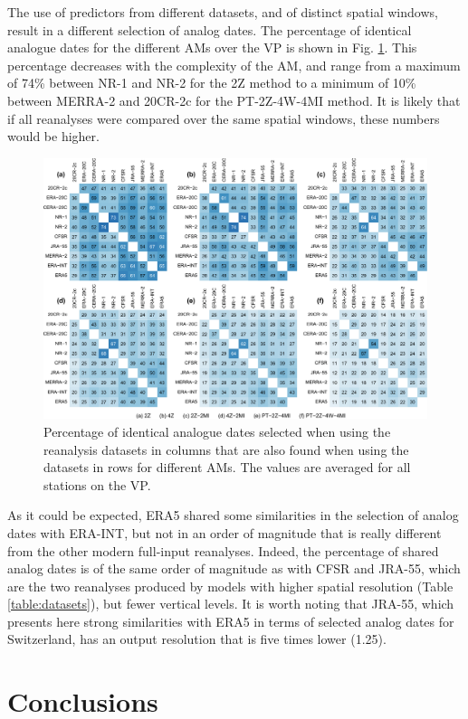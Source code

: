 \documentclass[alpha-refs]{wiley-article}
\begin{document}
The use of predictors from different datasets, and of distinct spatial windows, result in a different selection of analog dates. The percentage of identical analogue dates for the different AMs over the VP is shown in Fig. \ref{fig:shared-dates}. This percentage decreases with the complexity of the AM, and range from a maximum of 74\% between NR-1 and NR-2 for the 2Z method to a minimum of 10\% between MERRA-2 and 20CR-2c for the PT-2Z-4W-4MI method. It is likely that if all reanalyses were compared over the same spatial windows, these numbers would be higher.

\begin{figure}[bt]
	\centering
	\includegraphics[width=120mm]{figures/similar-dates.pdf}
	\caption{Percentage of identical analogue dates selected when using the reanalysis datasets in columns that are also found when using the datasets in rows for different AMs. The values are averaged for all stations on the VP.}
	\label{fig:shared-dates}
\end{figure}

As it could be expected, ERA5 shared some similarities in the selection of analog dates with ERA-INT, but not in an order of magnitude that is really different from the other modern full-input reanalyses. Indeed, the percentage of shared analog dates is of the same order of magnitude as with CFSR and JRA-55, which are the two reanalyses produced by models with higher spatial resolution (Table \ref{table:datasets}), but fewer vertical levels. It is worth noting that JRA-55, which presents here strong similarities with ERA5 in terms of selected analog dates for Switzerland, has an output resolution that is five times lower (1.25\degree). 


\section{Conclusions}
\label{sec:conclusions}
\end{document}
